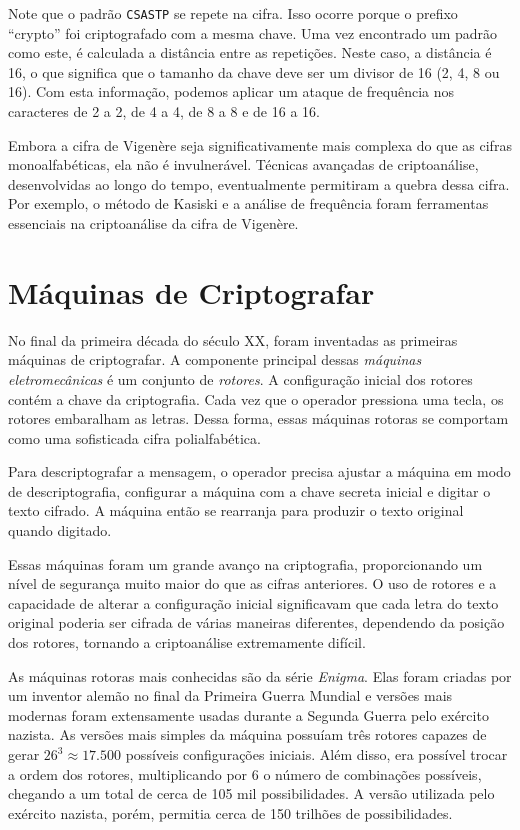 Note que o padrão {\tt CSASTP} se repete na cifra.
Isso ocorre porque o prefixo ``crypto'' foi criptografado com a mesma chave.
Uma vez encontrado um padrão como este, é calculada a distância entre as repetições.
Neste caso, a distância é 16, o que significa que o tamanho da chave deve ser um divisor de 16 (2, 4, 8 ou 16).
Com esta informação, podemos aplicar um ataque de frequência nos caracteres de 2 a 2, de 4 a 4, de 8 a 8 e de 16 a 16.

Embora a cifra de Vigenère seja significativamente mais complexa do que as cifras monoalfabéticas, ela não é invulnerável.
Técnicas avançadas de criptoanálise, desenvolvidas ao longo do tempo, eventualmente permitiram a quebra dessa cifra.
Por exemplo, o método de Kasiski e a análise de frequência foram ferramentas essenciais na criptoanálise da cifra de Vigenère.

\section{Máquinas de Criptografar}
\label{sec:maquinas}

No final da primeira década do século XX, foram inventadas as primeiras máquinas de criptografar.
A componente principal dessas {\em máquinas eletromecânicas} é um conjunto de {\em rotores}.
A configuração inicial dos rotores contém a chave da criptografia.
Cada vez que o operador pressiona uma tecla, os rotores embaralham as letras.
Dessa forma, essas máquinas rotoras se comportam como uma sofisticada cifra polialfabética.

Para descriptografar a mensagem, o operador precisa ajustar a máquina em modo de descriptografia, configurar a máquina com a chave secreta inicial e digitar o texto cifrado.
A máquina então se rearranja para produzir o texto original quando digitado.

Essas máquinas foram um grande avanço na criptografia, proporcionando um nível de segurança muito maior do que as cifras anteriores.
O uso de rotores e a capacidade de alterar a configuração inicial significavam que cada letra do texto original poderia ser cifrada de várias maneiras diferentes, dependendo da posição dos rotores, tornando a criptoanálise extremamente difícil.

As máquinas rotoras mais conhecidas são da série {\em Enigma}.
Elas foram criadas por um inventor alemão no final da Primeira Guerra Mundial e versões mais modernas foram extensamente usadas durante a Segunda Guerra pelo exército nazista.
As versões mais simples da máquina possuíam três rotores capazes de gerar $26^3 \approx 17.500$ possíveis configurações iniciais.
Além disso, era possível trocar a ordem dos rotores, multiplicando por 6 o número de combinações possíveis, chegando a um total de cerca de 105 mil possibilidades.
A versão utilizada pelo exército nazista, porém, permitia cerca de 150 trilhões de possibilidades.

